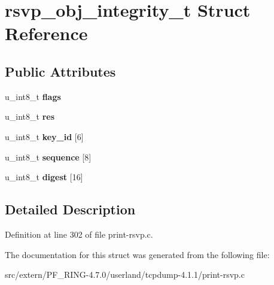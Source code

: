 \hypertarget{structrsvp__obj__integrity__t}{
\section{rsvp\_\-obj\_\-integrity\_\-t Struct Reference}
\label{structrsvp__obj__integrity__t}
}
\subsection*{Public Attributes}
\begin{DoxyCompactItemize}
\item 
\hypertarget{structrsvp__obj__integrity__t_a36b60cfa7ab7d3243dc0c25a2d752ca8}{
u\_\-int8\_\-t {\bfseries flags}}
\label{structrsvp__obj__integrity__t_a36b60cfa7ab7d3243dc0c25a2d752ca8}

\item 
\hypertarget{structrsvp__obj__integrity__t_a7a05a8583b5d2e8410adeb45f2a79da2}{
u\_\-int8\_\-t {\bfseries res}}
\label{structrsvp__obj__integrity__t_a7a05a8583b5d2e8410adeb45f2a79da2}

\item 
\hypertarget{structrsvp__obj__integrity__t_a1fd816c740c73f4ff96d49eaaa51cf36}{
u\_\-int8\_\-t {\bfseries key\_\-id} \mbox{[}6\mbox{]}}
\label{structrsvp__obj__integrity__t_a1fd816c740c73f4ff96d49eaaa51cf36}

\item 
\hypertarget{structrsvp__obj__integrity__t_a687ee4a2e1decf786c5cc49d297bff75}{
u\_\-int8\_\-t {\bfseries sequence} \mbox{[}8\mbox{]}}
\label{structrsvp__obj__integrity__t_a687ee4a2e1decf786c5cc49d297bff75}

\item 
\hypertarget{structrsvp__obj__integrity__t_a0941145822c4cfb0b62768a1b88e7840}{
u\_\-int8\_\-t {\bfseries digest} \mbox{[}16\mbox{]}}
\label{structrsvp__obj__integrity__t_a0941145822c4cfb0b62768a1b88e7840}

\end{DoxyCompactItemize}


\subsection{Detailed Description}


Definition at line 302 of file print-\/rsvp.c.



The documentation for this struct was generated from the following file:\begin{DoxyCompactItemize}
\item 
src/extern/PF\_\-RING-\/4.7.0/userland/tcpdump-\/4.1.1/print-\/rsvp.c\end{DoxyCompactItemize}
